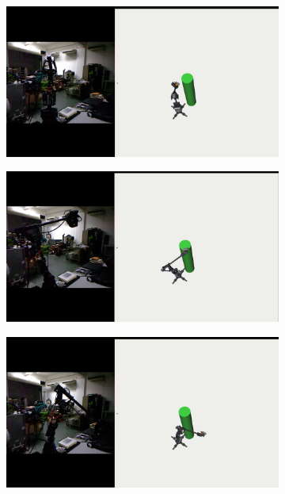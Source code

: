 \begin{figure}
  \centering
  \captionsetup{justification=centering}
  \begin{subfigure}[b]{0.4\linewidth}
    \label{subfig:top_view}
    \includegraphics[width=\linewidth]{obs_avoidance1.png}
     \caption{}
  \end{subfigure}
  \begin{subfigure}[b]{0.4\linewidth}
    \includegraphics[width=\linewidth]{obs_avoidance2.png}
    \caption{}
  \end{subfigure}
  \begin{subfigure}[b]{0.4\linewidth}
    \includegraphics[width=\linewidth]{obs_avoidance3.png}

\end{subfigure}
\end{figure}

